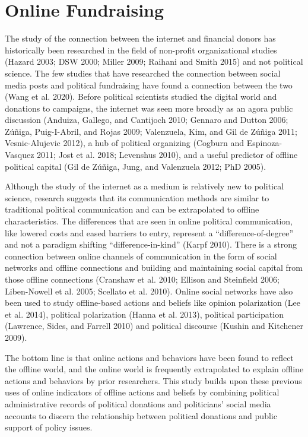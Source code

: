 \documentclass[12pt,]{article}
\begin{document}
\hypertarget{online-fundraising}{%
\section{Online Fundraising}\label{online-fundraising}}

The study of the connection between the internet and financial donors
has historically been researched in the field of non-profit
organizational studies (Hazard 2003; DSW 2000; Miller 2009; Raihani and
Smith 2015) and not political science. The few studies that have
researched the connection between social media posts and political
fundraising have found a connection between the two (Wang et al. 2020).
Before political scientists studied the digital world and donations to
campaigns, the internet was seen more broadly as an agora public
discussion (Anduiza, Gallego, and Cantijoch 2010; Gennaro and Dutton
2006; Zúñiga, Puig-I-Abril, and Rojas 2009; Valenzuela, Kim, and Gil de
Zúñiga 2011; Vesnic-Alujevic 2012), a hub of political organizing
(Cogburn and Espinoza-Vasquez 2011; Jost et al. 2018; Levenshus 2010),
and a useful predictor of offline political capital (Gil de Zúñiga,
Jung, and Valenzuela 2012; PhD 2005).

Although the study of the internet as a medium is relatively new to
political science, research suggests that its communication methods are
similar to traditional political communication and can be extrapolated
to offline characteristics. The differences that are seen in online
political communication, like lowered costs and eased barriers to entry,
represent a ``difference-of-degree'' and not a paradigm shifting
``difference-in-kind'' (Karpf 2010). There is a strong connection
between online channels of communication in the form of social networks
and offline connections and building and maintaining social capital from
those offline connections (Cranshaw et al. 2010; Ellison and Steinfield
2006; Liben-Nowell et al. 2005; Scellato et al. 2010). Online social
networks have also been used to study offline-based actions and beliefs
like opinion polarization (Lee et al. 2014), political polarization
(Hanna et al. 2013), political participation (Lawrence, Sides, and
Farrell 2010) and political discourse (Kushin and Kitchener 2009).

The bottom line is that online actions and behaviors have been found to
reflect the offline world, and the online world is frequently
extrapolated to explain offline actions and behaviors by prior
researchers. This study builds upon these previous uses of online
indicators of offline actions and beliefs by combining political
administrative records of political donations and politicians' social
media accounts to discern the relationship between political donations
and public support of policy issues.
\end{document}
